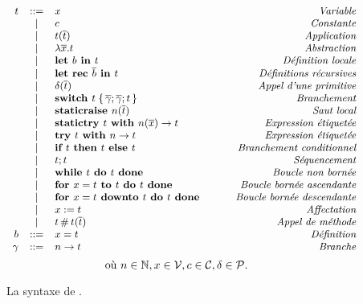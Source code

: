 \begin{figure}

\[\small
\begin{array}{rclr}
t
  & ::= & x & \qquad\textit{Variable} \\
  & |   & c & \qquad\textit{Constante} \\
  & |   & t (\overline{t}) & \qquad\textit{Application} \\
  & |   & \lambda \overline{x}. t & \qquad\textit{Abstraction} \\
  & |   & \textbf{let }b \textbf{ in } t & \qquad\textit{Définition locale} \\
  & |   & \textbf{let rec }\overline{b} \textbf{ in } t & \qquad\textit{Définitions récursives} \\
  & |   & \delta (\overline{t}) & \qquad\textit{Appel d'une primitive} \\
  & |   & \textbf{switch } t \;\{\, \overline{\gamma}; \overline{\gamma}; t \,\}
        & \qquad\textit{Branchement} \\
  & |   & \textbf{staticraise } n (\overline{t}) & \qquad\textit{Saut local} \\
  & |   & \textbf{statictry } t \textbf{ with } n (\overline{x}) \rightarrow t & \qquad\textit{Expression étiquetée} \\
  & |   & \textbf{try } t \textbf{ with } n \rightarrow t & \qquad\textit{Expression étiquetée} \\
  & |   & \textbf{if } t \textbf{ then } t \textbf{ else } t & \qquad\textit{Branchement conditionnel} \\
  & |   & t ; t & \qquad\textit{Séquencement} \\
  & |   & \textbf{while } t \textbf{ do } t \textbf{ done } & \qquad\textit{Boucle non bornée} \\
  & |   & \textbf{for } x = t \textbf{ to } t \textbf{ do } t \textbf{ done } & \qquad\textit{Boucle bornée ascendante} \\
  & |   & \textbf{for } x = t \textbf{ downto } t \textbf{ do } t \textbf{ done } & \qquad\textit{Boucle bornée descendante} \\
  & |   & x := t & \qquad\textit{Affectation} \\
  & |   & t \,\#\, t (\overline{t}) & \qquad\textit{Appel de méthode} \\
b & ::= & x = t & \qquad\textit{Définition} \\
\gamma  & ::= & n \rightarrow t & \qquad\textit{Branche} \\
\end{array}
\]
\[
\textrm{où }
n \in \mathbb{N},
x \in \mathcal{V},
c \in \mathcal{C},
\delta \in \mathcal{P}.
\]

\caption{La syntaxe de {\LambdaCode}.}
\label{fig:lambda-syntax}
\end{figure}
